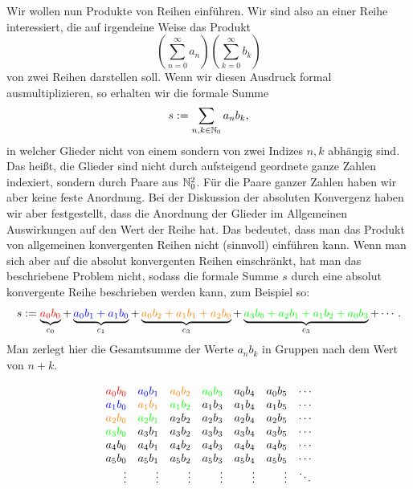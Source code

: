 \begin{bem}
	Wir wollen nun Produkte von Reihen einführen. Wir sind also an einer Reihe interessiert, die auf irgendeine Weise das Produkt 
	\[
		\left( \sum_{n=0}^\infty a_n \right) \left( \sum_{k=0}^\infty b_k \right) 
	\]
	von zwei Reihen darstellen soll. Wenn wir diesen Ausdruck formal ausmultiplizieren, so erhalten wir die formale Summe
	\[
		s:=\sum_{n,k \in \mathbb{N}_0} a_n b_k,
	\]
	in welcher Glieder nicht von einem sondern von zwei Indizes $n,k$ abhängig sind. Das heißt, die Glieder sind nicht durch aufsteigend geordnete ganze Zahlen indexiert, sondern durch Paare aus $\mathbb{N}_0^2$. Für die Paare ganzer Zahlen haben wir aber keine feste Anordnung. Bei der Diskussion der absoluten Konvergenz haben wir aber festgestellt, dass die Anordnung der Glieder im Allgemeinen Auswirkungen auf den Wert der Reihe hat. Das bedeutet, dass man das Produkt von allgemeinen konvergenten Reihen nicht (sinnvoll) einführen kann. Wenn man sich aber auf die absolut konvergenten Reihen einschränkt, hat man das beschriebene Problem nicht, sodass die formale Summe $s$ durch eine absolut konvergente Reihe beschrieben werden kann, zum Beispiel so: 
	\[
		s:= \underbrace{\color{red} a_0 b_0}_{c_0} + \underbrace{\color{blue} a_0 b_1 + a_1 b_0}_{c_1} + \underbrace{\color{orange} a_0 b_2 + a_1 b_1 + a_2 b_0}_{c_3} + \underbrace{\color{green} a_3 b_0 + a_2 b_1 + a_1 b_2 + a_0 b_3}_{c_3} + \cdots  . 
	\]
	Man zerlegt hier die Gesamtsumme der Werte $a_n b_k$ in Gruppen nach dem Wert von $n+k$. 
	
	\[
	\begin{array}{rrrrrrc}
		{\color{red} a_{0} b_{0} } & {\color{blue} a_{0} b_{1}} & {\color{orange} a_{0} b_{2} } & {\color{green} a_{0} b_{3}} & a_{0} b_{4} & a_{0} b_{5} & \cdots  \\
		{\color{blue} a_{1} b_{0}} &{\color{orange}  a_{1} b_{1}} & {\color{green} a_{1} b_{2} } & a_{1} b_{3} & a_{1} b_{4} & a_{1} b_{5} & \cdots \\
		{\color{orange} a_{2} b_{0} } & {\color{green} a_{2} b_{1}} & a_{2} b_{2} & a_{2} b_{3} & a_{2} b_{4} & a_{2} b_{5} & \cdots \\
		{\color{green} a_{3} b_{0}} & a_{3} b_{1} & a_{3} b_{2} & a_{3} b_{3} & a_{3} b_{4} & a_{3} b_{5} & \cdots \\
		a_{4} b_{0} & a_{4} b_{1} & a_{4} b_{2} & a_{4} b_{3} & a_{4} b_{4} & a_{4} b_{5} & \cdots \\
		a_{5} b_{0} & a_{5} b_{1} & a_{5} b_{2} & a_{5} b_{3} & a_{5} b_{4} & a_{5} b_{5} & \cdots \\
		\vdots & \vdots & \vdots & \vdots & \vdots & \vdots & \ddots 
	\end{array}
\]
\end{bem} 

